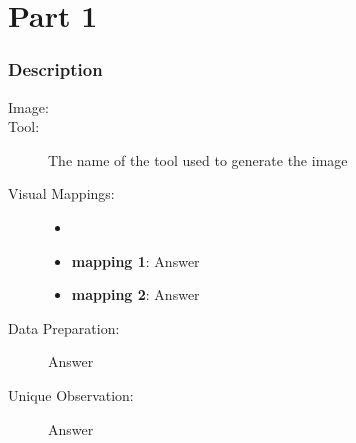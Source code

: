 \hypertarget{part-1-design-1}{%
\section{Part 1}\label{part-1-design-1}}

\centering


\hypertarget{description}{%
\subsubsection{Description}\label{description}}

\begin{description}
	\item[Image:]
	\item[Tool:]
		The name of the tool used to generate the image
	\item[Visual Mappings:]
	\begin{itemize}
		\tightlist
		\item[ ]
	\end{itemize}
	\begin{itemize}
		\tightlist
		\item
		  \textbf{mapping 1}: Answer
	\end{itemize}

	\begin{itemize}
		\tightlist
		\item
		  \textbf{mapping 2}: Answer
	\end{itemize}
	\item[Data Preparation:] Answer
	\item[Unique Observation:]
		Answer
		
\end{description}
